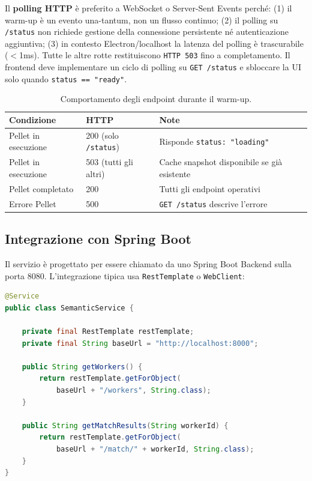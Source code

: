 \documentclass[a4paper,12pt]{article}
\begin{document}
Il \textbf{polling HTTP} \`{e} preferito a WebSocket o Server-Sent Events
perch\'{e}: (1) il warm-up \`{e} un evento una-tantum, non un flusso
continuo; (2) il polling su \texttt{/status} non richiede gestione della
connessione persistente n\'{e} autenticazione aggiuntiva; (3) in contesto
Electron/localhost la latenza del polling \`{e} trascurabile ($<$1ms).
Tutte le altre rotte restituiscono \texttt{HTTP 503}
fino a completamento. Il frontend deve implementare un ciclo di polling
su \texttt{GET /status} e sbloccare la UI solo quando
\texttt{status == "ready"}.

\begin{table}[H]
\centering
\caption{Comportamento degli endpoint durante il warm-up.}
\begin{tabular}{L{4cm} C{3cm} L{5.5cm}}
\toprule
\textbf{Condizione} & \textbf{HTTP} & \textbf{Note} \\
\midrule
Pellet in esecuzione & 200 (solo \texttt{/status}) & Risponde \texttt{status: "loading"} \\
Pellet in esecuzione & 503 (tutti gli altri) & Cache snapshot disponibile se gi\`{a} esistente \\
Pellet completato & 200 & Tutti gli endpoint operativi \\
Errore Pellet & 500 & \texttt{GET /status} descrive l'errore \\
\bottomrule
\end{tabular}
\end{table}

\subsection{Integrazione con Spring Boot}

Il servizio \`{e} progettato per essere chiamato da uno Spring Boot
Backend sulla porta 8080. L'integrazione tipica usa \texttt{RestTemplate}
o \texttt{WebClient}:

\begin{lstlisting}[language=Java, caption={Esempio di chiamata da Spring Boot con RestTemplate.}]
@Service
public class SemanticService {

    private final RestTemplate restTemplate;
    private final String baseUrl = "http://localhost:8000";

    public String getWorkers() {
        return restTemplate.getForObject(
            baseUrl + "/workers", String.class);
    }

    public String getMatchResults(String workerId) {
        return restTemplate.getForObject(
            baseUrl + "/match/" + workerId, String.class);
    }
}
\end{lstlisting}
\end{document}
